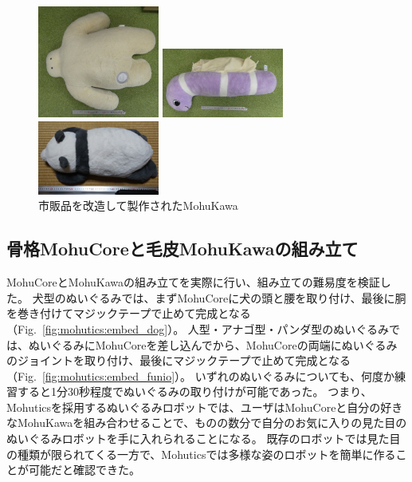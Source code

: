 \documentclass[uplatex,a4paper,12pt]{jsarticle}
\renewcommand{\figurename}{Fig.}
\newcommand{\figref}[1]{\figurename~\ref{#1}}
\begin{document}
\begin{figure}[htbp]
  \centering
  \begin{minipage}[c]{0.32\linewidth}
    \centering
    \includegraphics[keepaspectratio,width=4cm,clip]{images/mohukawa/funio.jpg}
  \end{minipage}
  \begin{minipage}[c]{0.32\linewidth}
    \centering
    \includegraphics[keepaspectratio,width=4cm,clip]{images/mohukawa/anago.jpg}
  \end{minipage}
  \begin{minipage}[c]{0.32\linewidth}
    \centering
    \includegraphics[keepaspectratio,width=4cm,clip]{images/mohukawa/panda.jpg}
  \end{minipage}
  \caption{市販品を改造して製作されたMohuKawa}
  \label{fig:mohukawa:funio_anago_panda}
\end{figure}


\subsection{骨格MohuCoreと毛皮MohuKawaの組み立て}
MohuCoreとMohuKawaの組み立てを実際に行い、組み立ての難易度を検証した。
犬型のぬいぐるみでは、まずMohuCoreに犬の頭と腰を取り付け、最後に胴を巻き付けてマジックテープで止めて完成となる（\figref{fig:mohutics:embed_dog}）。
人型・アナゴ型・パンダ型のぬいぐるみでは、ぬいぐるみにMohuCoreを差し込んでから、MohuCoreの両端にぬいぐるみのジョイントを取り付け、最後にマジックテープで止めて完成となる（\figref{fig:mohutics:embed_funio}）。
いずれのぬいぐるみについても、何度か練習すると1分30秒程度でぬいぐるみの取り付けが可能であった。
つまり、Mohuticsを採用するぬいぐるみロボットでは、ユーザはMohuCoreと自分の好きなMohuKawaを組み合わせることで、ものの数分で自分のお気に入りの見た目のぬいぐるみロボットを手に入れられることになる。
既存のロボットでは見た目の種類が限られてくる一方で、Mohuticsでは多様な姿のロボットを簡単に作ることが可能だと確認できた。
\end{document}

